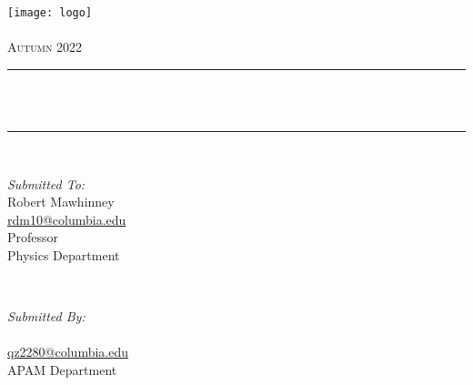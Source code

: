\begin{titlepage}
    \centering
    \vspace*{2 cm}
    \texttt{[image: logo]}\\[1.0 cm]
    \textsc{\LARGE \institution}\\[2.0 cm]
    \textsc{\Large Autumn 2022}\\[0.5 cm]
    \rule{\linewidth}{0.2 mm}\\[0.4 cm]
    {\huge \bfseries \thetitle}\\
    \rule{\linewidth}{0.2 mm}\\[1.5 cm]

    \begin{minipage}{0.4\textwidth}
        \begin{flushleft} \large
            \emph{Submitted To:}\\
            Robert Mawhinney\\
            \href{mailto:rdm10@columbia.edu}{rdm10@columbia.edu}\\
            Professor\\
            Physics Department\\
        \end{flushleft}
    \end{minipage}~
    \begin{minipage}{0.4\textwidth}
        \begin{flushright} \large
            \emph{Submitted By:} \\
            \theauthor\\
            \href{mailto:qz2280@columbia.edu}{qz2280@columbia.edu}\\
            APAM Department\\
            \thedate\\
        \end{flushright}
    \end{minipage}\\[2 cm]
\end{titlepage}

\newpage
